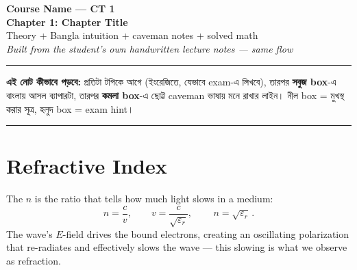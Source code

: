 %
%   
%   
%   


\begin{center}
  {\Huge\bfseries\color{ink} Course Name — CT 1}\\[4pt]
  {\Large\bfseries\color{accent} Chapter 1: Chapter Title}\\[8pt]
  {\small Theory + Bangla intuition + caveman notes + solved math}\\[2pt]
  {\small\itshape Built from the student's own handwritten lecture notes — same flow}\\[6pt]
  {\color{accent}\rule{0.7\textwidth}{1pt}}
\end{center}

\vspace{4pt}
\begin{tcolorbox}[colback=softgrey, colframe=ink, boxrule=0.6pt, arc=3pt, left=10pt, right=10pt]
{\bfseries\color{ink} এই নোট কীভাবে পড়বে:} প্রতিটা টপিকে আগে  (ইংরেজিতে, যেভাবে
exam-এ লিখবে), তারপর \textcolor{banglafr}{\textbf{সবুজ box}}-এ বাংলায় আসল ব্যাপারটা, তারপর
\textcolor{cavefr}{\textbf{কমলা box}}-এ ছোট্ট caveman ভাষায় মনে রাখার লাইন। নীল box = মুখস্থ
করার সূত্র, হলুদ box = exam hint।
\end{tcolorbox}

\tableofcontents
\vspace{6pt}\hrule\vspace{10pt}


\section{Refractive Index}

The  $n$ is the ratio that tells how much light slows in a medium:
\[
n=\frac{c}{v},\qquad v=\frac{c}{\sqrt{\varepsilon_r}},\qquad \boxed{\,n=\sqrt{\varepsilon_r}\,}.
\]
The wave's $E$-field drives the bound electrons, creating an oscillating polarization that
re-radiates and effectively slows the wave — this slowing is what we observe as refraction.

